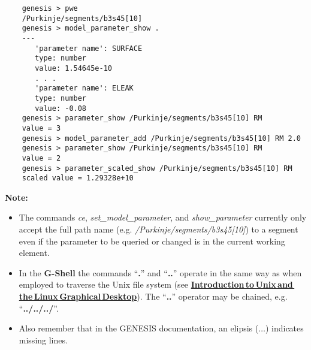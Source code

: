 \documentclass[12pt]{article}
\begin{document}
\begin{verbatim}
    genesis > pwe
    /Purkinje/segments/b3s45[10]
    genesis > model_parameter_show .
    ---
       'parameter name': SURFACE
       type: number
       value: 1.54645e-10
       . . .
       'parameter name': ELEAK
       type: number
       value: -0.08
    genesis > parameter_show /Purkinje/segments/b3s45[10] RM
    value = 3    
    genesis > model_parameter_add /Purkinje/segments/b3s45[10] RM 2.0
    genesis > parameter_show /Purkinje/segments/b3s45[10] RM
    value = 2
    genesis > parameter_scaled_show /Purkinje/segments/b3s45[10] RM
    scaled value = 1.29328e+10
\end{verbatim}

{\bf Note:}

\begin{itemize}
\item The commands {\it ce}, {\it set\_model\_parameter}, and {\it show\_parameter} currently only accept the full path name (e.g. {\it  /Purkinje/segments/b3s45[10]}) to a segment even if the parameter to be queried or changed is in the current working element. %

\item In the {\bf G-Shell} the commands ``{\bf .}'' and ``{\bf ..}'' operate in the same way as when employed to traverse the Unix file system (see \href{../unix-linux/unix-linux.tex}{\bf Introduction\,to\,Unix\,and\,the\,Linux\,Graphical\,Desktop}). The ``{\bf ..}'' operator may be chained, e.g. ``{\bf ../../../}''.

\item Also remember that in the GENESIS documentation, an elipsis ($\ldots$) indicates missing lines.

\end{itemize}
\end{document}
